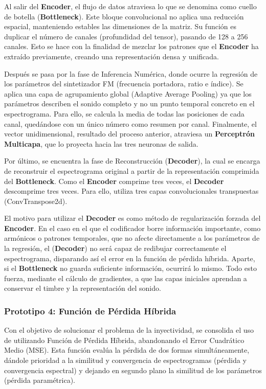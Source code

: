 \documentclass[12pt, a4paper]{article}
\begin{document}
Al salir del \textbf{Encoder}, el flujo de datos atraviesa lo que se denomina como
cuello de botella (\textbf{Bottleneck}). Este bloque convolucional no
aplica una reducción espacial, manteniendo estables las dimensiones de la matriz. Su función es duplicar el número
de canales (profundidad del tensor), pasando de 128 a 256 canales. Esto se hace con la finalidad de 
mezclar los patrones que el \textbf{Encoder} ha extraído previamente, creando una representación
densa y unificada.

Después se pasa por la fase de Inferencia Numérica, donde ocurre la regresión de los parámetros del sintetizador FM
(frecuencia portadora, ratio e índice). Se aplica una capa de agrupamiento global (Adaptive Average Pooling) ya que los 
parámetros describen el sonido completo y no un punto temporal concreto en el espectrograma.
Para ello, se calcula la media de todas las posiciones de cada canal, quedándose con un único
número como resumen por canal. Finalmente, el vector unidimensional, resultado del proceso anterior,
atraviesa un \textbf{Perceptrón Multicapa}, que lo proyecta hacia las tres neuronas de salida.

Por último, se encuentra la fase de Reconstrucción (\textbf{Decoder}), la cual se encarga de reconstruir 
el espectrograma original a partir de la representación comprimida del \textbf{Bottleneck}. 
Como el \textbf{Encoder} comprime tres veces, el \textbf{Decoder} descomprime tres veces. Para ello,
utiliza tres capas convolucionales transpuestas (ConvTranspose2d).

El motivo para utilizar el \textbf{Decoder} es como método de regularización forzada del \textbf{Encoder}.
En el caso en el que el codificador borre información importante, como armónicos o patrones temporales, que no afecte directamente a los parámetros
de la regresión, el (\textbf{Decoder}) no será capaz de redibujar correctamente el espectrograma, disparando así
el error en la función de pérdida híbrida. Aparte, si el \textbf{Bottleneck} no guarda suficiente información, ocurrirá lo mismo.
Todo esto fuerza, mediante el cálculo de gradientes, a que las capas iniciales aprendan a conservar el timbre y la representación
del sonido.

\subsubsection{Prototipo 4: Función de Pérdida Híbrida}
Con el objetivo de solucionar el problema de la inyectividad, se consolida el uso de utilizando
Función de Pérdida Híbrida, abandonando el Error Cuadrático Medio (MSE). Esta función evalúa la pérdida
de dos formas simultáneamente, dándole prioridad a la similitud y convergencia de espectrogramas (pérdida y convergencia espectral)
y dejando en segundo plano la similitud de los parámetros (pérdida paramétrica).
\end{document}
